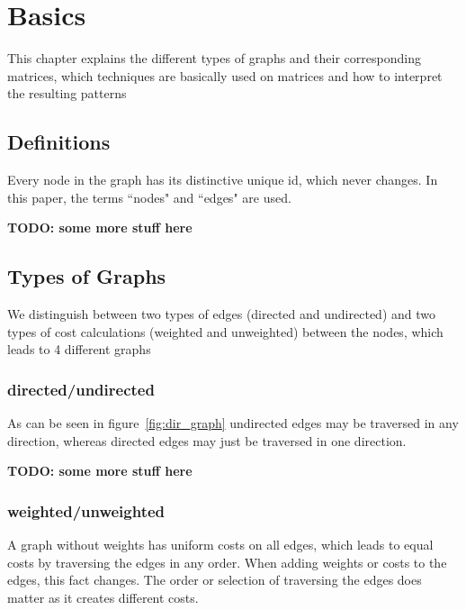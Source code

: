 %
%
% 
% 
% 


\chapter{Basics}\label{chap:Basics}


This chapter explains the different types of graphs and their corresponding matrices, which techniques are basically used on matrices and how to interpret the resulting patterns

\section{Definitions}
Every node in the graph has its distinctive unique id, which never changes. In this paper, the terms ``nodes" and ``edges" are used. 

\textbf{TODO: some more stuff here}




\section{Types of Graphs}

We distinguish between two types of edges (directed and undirected) and two types of cost calculations (weighted and unweighted) between the nodes, which leads to 4 different graphs

\subsection{directed/undirected}

As can be seen in figure~\ref{fig:dir_graph} undirected edges may be traversed in any direction, whereas directed edges may just be traversed in one direction. 

\textbf{TODO: some more stuff here}

\subsection{weighted/unweighted}

A graph without weights has uniform costs on all edges, which leads to equal costs by traversing the edges in any order. When adding weights or costs to the edges, this fact changes. The order or selection of traversing the edges does matter as it creates different costs.


